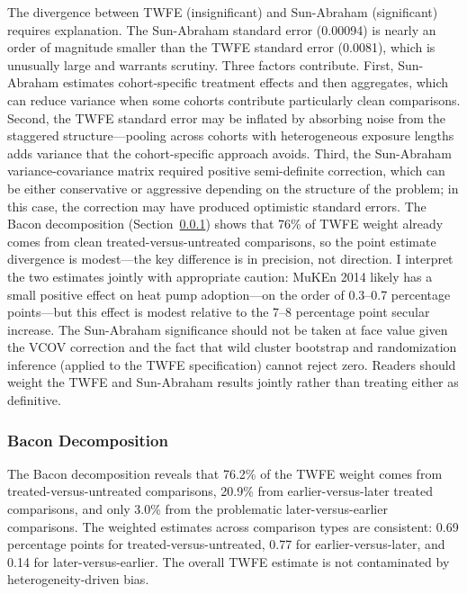 \documentclass[12pt]{article}
\begin{document}
The divergence between TWFE (insignificant) and Sun-Abraham (significant) requires explanation. The Sun-Abraham standard error (0.00094) is nearly an order of magnitude smaller than the TWFE standard error (0.0081), which is unusually large and warrants scrutiny. Three factors contribute. First, Sun-Abraham estimates cohort-specific treatment effects and then aggregates, which can reduce variance when some cohorts contribute particularly clean comparisons. Second, the TWFE standard error may be inflated by absorbing noise from the staggered structure---pooling across cohorts with heterogeneous exposure lengths adds variance that the cohort-specific approach avoids. Third, the Sun-Abraham variance-covariance matrix required positive semi-definite correction, which can be either conservative or aggressive depending on the structure of the problem; in this case, the correction may have produced optimistic standard errors. The Bacon decomposition (Section~\ref{sec:bacon}) shows that 76\% of TWFE weight already comes from clean treated-versus-untreated comparisons, so the point estimate divergence is modest---the key difference is in precision, not direction. I interpret the two estimates jointly with appropriate caution: MuKEn 2014 likely has a small positive effect on heat pump adoption---on the order of 0.3--0.7 percentage points---but this effect is modest relative to the 7--8 percentage point secular increase. The Sun-Abraham significance should not be taken at face value given the VCOV correction and the fact that wild cluster bootstrap and randomization inference (applied to the TWFE specification) cannot reject zero. Readers should weight the TWFE and Sun-Abraham results jointly rather than treating either as definitive.



\subsubsection{Bacon Decomposition}
\label{sec:bacon}

The Bacon decomposition reveals that 76.2\% of the TWFE weight comes from treated-versus-untreated comparisons, 20.9\% from earlier-versus-later treated comparisons, and only 3.0\% from the problematic later-versus-earlier comparisons. The weighted estimates across comparison types are consistent: 0.69 percentage points for treated-versus-untreated, 0.77 for earlier-versus-later, and 0.14 for later-versus-earlier. The overall TWFE estimate is not contaminated by heterogeneity-driven bias.
\end{document}
